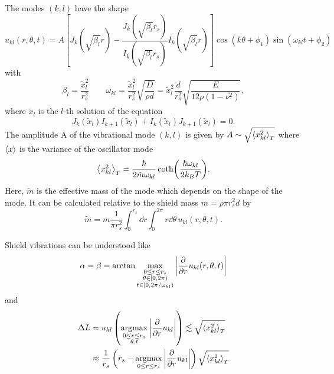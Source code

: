 The modes $(k,l)$ have the shape
\begin{equation}
  u_{kl}(r, \theta, t) = A\left[J_k(\sqrt{\beta_l}r) - \frac{J_k(\sqrt{\beta_l}r_s)}{I_k(\sqrt{\beta_l}r_s)}I_k(\sqrt{\beta_l}r)\right]\cos(k\theta+\phi_1)\sin(\omega_{kl}t+\phi_2)
\end{equation}
with
\begin{equation}
  \beta_l = \frac{\tilde{x}_l^2}{r_s^2} \quad \quad \omega_{kl} = \frac{\tilde{x}_l^2}{r_s^2}\sqrt{\frac{D}{\rho d}} = \tilde{x}_l^2\frac{d}{r_s^2}\sqrt{\frac{E}{12\rho(1-\nu^2)}} ,
\end{equation}
where $\tilde{x}_l$ is the $l$-th solution of the equation
\begin{equation}
  J_k(\tilde{x}_l)I_{k+1}(\tilde{x}_l)+I_k(\tilde{x}_l)J_{k+1}(\tilde{x}_l) = 0 .
\end{equation}
The amplitude A of the vibrational mode $(k,l)$ is given by $A \sim \sqrt{\left\langle x_{kl}^2\right\rangle_T}$ where $\left\langle x\right\rangle$ is the variance of the oscillator mode
\begin{equation}
  \left\langle x_{kl}^2\right\rangle_T = \frac{\hbar}{2\tilde{m}\omega_{kl}} \coth(\frac{\hbar \omega_{kl}}{2 k_B T}) .
\end{equation}
Here, $\tilde{m}$ is the effective mass of the mode which depends on the shape of the mode. It can be calculated relative to the shield mass $m=\rho \pi r_s^2 d$ by
\begin{equation}
  \tilde{m} = m\frac{1}{\pi r_s^2}\int_0^{r_s} \dd r \int_0^{2\pi} r\dd\theta \, u_{kl}(r, \theta, t) .
\end{equation}

Shield vibrations can be understood like
\begin{equation}
  \alpha = \beta = \arctan{\max_{\substack{0 \leq r \leq r_s \\ \theta \in[0, 2\pi) \\ t \in [0,2\pi/\omega_{kl})}} \left\lvert\pdv{r}u_{kl}(r,\theta,t)\right\rvert}
\end{equation}
and
\begin{align}
  \Delta L &= u_{kl}\left(\operatorname*{arg max}_{\substack{0 \leq r \leq r_s \\ \theta, t}} \left\lvert\pdv{r}u_{kl}\right\rvert \right) \lesssim \sqrt{\left\langle x_{kl}^2\right\rangle_T} \\
  &\approx \frac{1}{r_s} \left(r_s - \operatorname*{arg max}_{0 \leq r \leq r_s}\left\lvert\pdv{r}u_{kl}\right\rvert\right)\sqrt{\left\langle x_{kl}^2\right\rangle_T}
\end{align}


